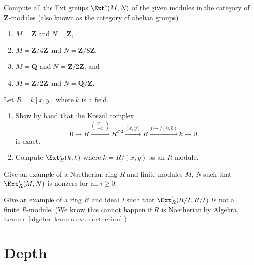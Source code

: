 \begin{exercise}
\label{exercise-compute-ext-abelian-groups}
Compute all the Ext groups $\Ext^i(M, N)$ of the given modules
in the category of $\mathbf{Z}$-modules
(also known as the category of abelian groups).
\begin{enumerate}
\item $M = \mathbf{Z}$ and $N = \mathbf{Z}$,
\item $M = \mathbf{Z}/4\mathbf{Z}$ and $N = \mathbf{Z}/8\mathbf{Z}$,
\item $M = \mathbf{Q}$ and $N = \mathbf{Z}/2\mathbf{Z}$, and
\item $M = \mathbf{Z}/2\mathbf{Z}$ and $N = \mathbf{Q}/\mathbf{Z}$.
\end{enumerate}
\end{exercise}

\begin{exercise}
\label{exercise-compute-in-regular}
Let $R = k[x, y]$ where $k$ is a field.
\begin{enumerate}
\item Show by hand that the Koszul complex
$$
0 \to R
\xrightarrow{
\left(
\begin{matrix}
y \\
-x
\end{matrix}
\right)
}
R^{\oplus 2} \xrightarrow{(x, y)} R \xrightarrow{f \mapsto f(0, 0)} k \to 0
$$
is exact.
\item Compute $\Ext^i_R(k, k)$ where $k = R/(x, y)$ as an $R$-module.
\end{enumerate}
\end{exercise}

\begin{exercise}
\label{exercise-infinitely-many-nonzero-ext}
Give an example of a Noetherian ring $R$ and finite modules $M$, $N$
such that $\Ext^i_R(M, N)$ is nonzero for all $i \geq 0$.
\end{exercise}

\begin{exercise}
\label{exercise-infinite-ext}
Give an example of a ring $R$ and ideal $I$ such that
$\Ext^1_R(R/I, R/I)$ is not a finite $R$-module.
(We know this cannot happen if $R$ is Noetherian by
Algebra, Lemma \ref{algebra-lemma-ext-noetherian}.)
\end{exercise}







\section{Depth}
\label{section-depth}

